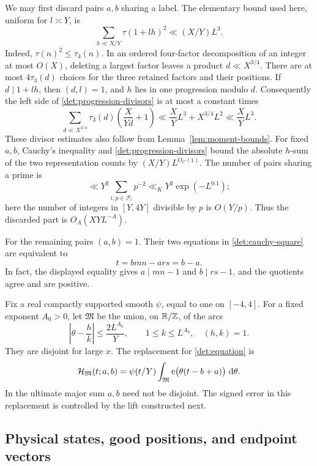 We may first discard pairs $a,b$ sharing a label.  The elementary
bound used here, uniform for $l\asymp Y$, is
\begin{equation}\label{det:progression-divisors}
 \sum_{h\ll X/Y}\tau(1+lh)^2\ll (X/Y)L^3.
\end{equation}
Indeed, $\tau(n)^2\leq\tau_4(n)$.  In an ordered four-factor
decomposition of an integer at most $O(X)$, deleting a largest
factor leaves a product $d\ll X^{3/4}$.  There are at most
$4\tau_3(d)$ choices for the three retained factors and their
positions.  If $d\mid1+lh$, then $(d,l)=1$, and $h$ lies in one
progression modulo $d$.  Consequently the left side of
\eqref{det:progression-divisors} is at most a constant times
\[
 \sum_{d\ll X^{3/4}}\tau_3(d)\left(\frac{X}{Yd}+1\right)
 \ll \frac XY L^3+X^{3/4}L^2\ll\frac XY L^3.
\]
These divisor estimates also follow from Lemma~\ref{lem:moment-bounds}.
For fixed $a,b$, Cauchy's inequality and
\eqref{det:progression-divisors} bound the absolute $h$-sum of the
two representation counts by $(X/Y)L^{O_C(1)}$.
The number of pairs sharing a prime is
\[
 \ll Y^2\sum_{i,p\in\mathcal P_i}p^{-2}
 \ll_K Y^2\exp(-L^{0.1});
\]
here the number of integers in $[Y,4Y]$ divisible by $p$ is
$O(Y/p)$.  Thus the discarded part is $O_A(XYL^{-A})$.

For the remaining pairs $(a,b)=1$.  Their two equations in
\eqref{det:cauchy-square} are equivalent to
\begin{equation}\label{det:equation}
 t=bmn-ars=b-a.
\end{equation}
In fact, the displayed equality gives $a\mid mn-1$ and
$b\mid rs-1$, and the quotients agree and are positive.

Fix a real compactly supported smooth $\psi$, equal to one on
$[-4,4]$.  For a fixed exponent $A_0>0$, let $\mathfrak M$ be the
union, on $\mathbb R/\mathbb Z$, of the arcs
\[
 \left|\theta-\frac hk\right|\leq\frac{2L^{A_0}}Y,
 \qquad 1\leq k\leq L^{A_0},\quad (h,k)=1.
\]
They are disjoint for large $x$.  The replacement for
\eqref{det:equation} is
\begin{equation}\label{eq:det-major}
 \mathcal H_{\mathfrak M}(t;a,b)
   =\psi(t/Y)\int_{\mathfrak M}
                  \mathrm{e}\bigl(\theta(t-b+a)\bigr)\,\,\mathrm d\theta.
\end{equation}
In the ultimate major sum $a,b$ need not be disjoint.  The signed
error in this replacement is controlled by the lift constructed
next.

\subsection{Physical states, good positions, and endpoint vectors}

